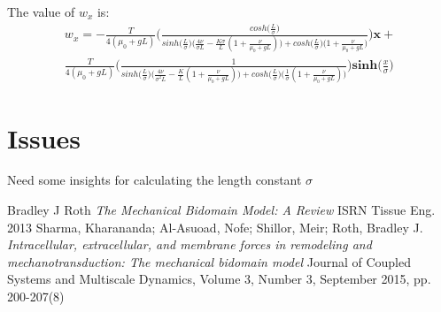 \documentclass[a4paper,oneside,11pt]{report}
\begin{document}
The value of $w_x$ is: 
\begin{align*}
w_x = -\frac{T}{4(\mu_0 + gL)} \Bigg ( \frac{cosh\Big ( \frac{L}{\sigma} \Big )}{sinh \Big( \frac{L}{\sigma}\Big ) \Big ( \frac{4\nu}{\sigma L} - \frac{K \sigma}{L} (1+ \frac{\nu}{\mu_0 + gL}) \Big ) + cosh\Big ( \frac{L}{\sigma} \Big ) \Big ( 1+ \frac{\nu}{\mu_0 + gL} \Big )} \Bigg)\textbf{x} + \\
\frac{T}{4(\mu_0 + gL)} \Bigg ( \frac{1}{sinh \Big( \frac{L}{\sigma}\Big ) \Big ( \frac{4\nu}{\sigma^2 L} - \frac{K}{L} (1+ \frac{\nu}{\mu_0 + gL}) \Big ) + cosh\Big ( \frac{L}{\sigma} \Big ) \Big (  \frac{1}{\sigma} (1+ \frac{\nu}{\mu_0 + gL}) \Big )} \Bigg)\textbf{sinh} \Big ( \frac{x}{\sigma} \Big )
\end{align*}
\section*{Issues}
Need some insights for calculating the length constant $\sigma$
\begin{thebibliography}{9}
	Bradley J Roth
	\textit{The Mechanical Bidomain Model: A Review}
	ISRN Tissue Eng. 2013
	 Sharma, Kharananda; Al-Asuoad, Nofe; Shillor, Meir; Roth, Bradley J.
	\textit{Intracellular, extracellular, and membrane forces in remodeling and mechanotransduction: The mechanical bidomain model}
	Journal of Coupled Systems and Multiscale Dynamics, Volume 3, Number 3, September 2015, pp. 200-207(8)
\end{thebibliography}
\end{document}
